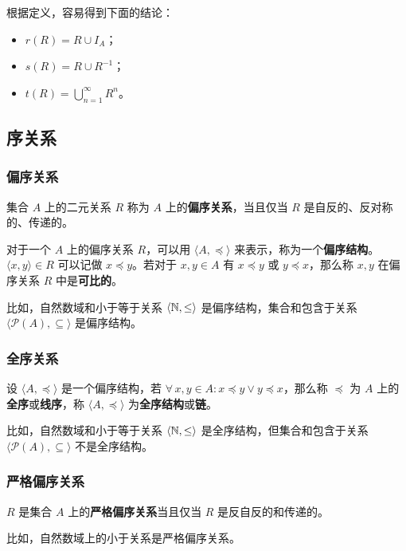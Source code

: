 根据定义，容易得到下面的结论：

\begin{itemize}
    \item $r(R) = R \cup I_A$；
    \item $s(R) = R \cup R^{-1}$；
    \item $\displaystyle t(R) = \bigcup_{n = 1}^{\infty} R^{n}$。
\end{itemize}

\subsection{序关系}

\subsubsection{偏序关系}

\begin{definition}[偏序关系]
    集合 $A$ 上的二元关系 $R$ 称为 $A$ 上的\textbf{偏序关系}，当且仅当 $R$ 是自反的、反对称的、传递的。
\end{definition}

对于一个 $A$ 上的偏序关系 $R$，可以用 $\langle A, \preceq \rangle$ 来表示，称为一个\textbf{偏序结构}。$\langle x, y \rangle \in R$ 可以记做 $x \preceq y$。若对于 $x, y \in A$ 有 $x \preceq y$ 或 $y \preceq x$，那么称 $x, y$ 在偏序关系 $R$ 中是\textbf{可比的}。

比如，自然数域和小于等于关系 $\langle \mathbb{N}, \le \rangle$ 是偏序结构，集合和包含于关系 $\langle \mathcal{P}(A), \subseteq \rangle$ 是偏序结构。

\subsubsection{全序关系}

\begin{definition}[全序关系]
    设 $\langle A, \preceq \rangle$ 是一个偏序结构，若 $\forall\,x, y \in A: x \preceq y \lor y \preceq x$，那么称 $\preceq$ 为 $A$ 上的\textbf{全序}或\textbf{线序}，称 $\langle A, \preceq \rangle$ 为\textbf{全序结构}或\textbf{链}。
\end{definition}

比如，自然数域和小于等于关系 $\langle \mathbb{N}, \le \rangle$ 是全序结构，但集合和包含于关系 $\langle \mathcal{P}(A), \subseteq \rangle$ 不是全序结构。

\subsubsection{严格偏序关系}

\begin{definition}[严格偏序关系]
    $R$ 是集合 $A$ 上的\textbf{严格偏序关系}当且仅当 $R$ 是反自反的和传递的。
\end{definition}

比如，自然数域上的小于关系是严格偏序关系。
